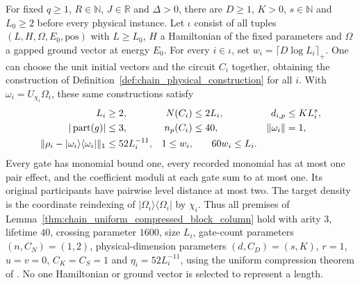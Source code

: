 \begin{lemma}
    \label{thm:chain_uniform_physical_family}
    \leanok
    For fixed $q\ge1$, $R\in\mathbb N$, $J\in\mathbb R$ and
    $\Delta>0$, there are $D\ge1$, $K>0$, $s\in\mathbb N$ and
    $L_0\ge2$ before every physical instance.
    Let $\iota$ consist of all tuples $(L,H,\Omega,E_0,\mathrm{pos})$
    with $L\ge L_0$, $H$ a Hamiltonian of the fixed parameters and
    $\Omega$ a gapped ground vector at energy $E_0$.
    For every $i\in\iota$, set $w_i=\lceil D\log L_i\rceil_+$.
    One can choose the unit initial vectors and the circuit
    $C_i$ together, obtaining the construction of
    Definition~\ref{def:chain_physical_construction} for all $i$.
    With $\omega_i=U_{\chi_i}\Omega_i$, these same constructions satisfy
    \begin{align}
        L_i                      & \ge2,           & N(C_i)    & \le2L_i,            & d_{i,p} & \le KL_i^s,\notag \\
        |\operatorname{part}(g)| & \le3,           & n_p(C_i)  & \le40,              &
        \|\omega_i\|             & =1,\notag                                                                       \\
        \|\rho_i-|\omega_i\rangle\langle\omega_i|\|_1
                                 & \le52L_i^{-11}, & 1\le w_i, & \qquad60w_i\le L_i.
        \label{eq:chain_uniform_physical_family}
    \end{align}
    Every gate has monomial bound one, every recorded monomial has at
    most one pair effect, and the coefficient moduli at each gate sum to
    at most one. Its original participants
    have pairwise level distance at most two.
    The target density is the coordinate reindexing of
    $|\Omega_i\rangle\langle\Omega_i|$ by $\chi_i$.
    Thus all premises of Lemma~\ref{thm:chain_uniform_compressed_block_column}
    hold with arity $3$, lifetime $40$, crossing parameter $1600$,
    size $L_i$, gate-count parameters $(n,C_N)=(1,2)$,
    physical-dimension parameters $(d,C_D)=(s,K)$,
    $r=1$, $u=v=0$, $C_K=C_S=1$ and $\eta_i=52L_i^{-11}$,
    using the uniform compression theorem of
    \cite[Theorem~5.2]{OpenAI2026PolynomialPEPS}.
    No one Hamiltonian or ground vector is selected to represent a length.
\end{lemma}
